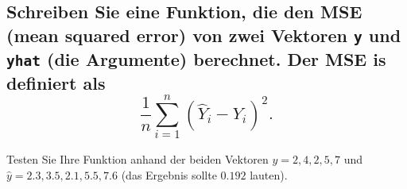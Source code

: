 \documentclass[12pt,a4paper]{article}
\begin{document}
\subsection{\texorpdfstring{Schreiben Sie eine Funktion, die den MSE
(mean squared error) von zwei Vektoren \texttt{y} und \texttt{yhat} (die
Argumente) berechnet. Der MSE is definiert als
\[\displaystyle \frac{1}{n}\sum_{i=1}^n (\hat{Y}_i - Y_i)^2.\]}{Schreiben Sie eine Funktion, die den MSE (mean squared error) von zwei Vektoren y und yhat (die Argumente) berechnet. Der MSE is definiert als \textbackslash displaystyle \textbackslash frac\{1\}\{n\}\textbackslash sum\_\{i=1\}\^{}n (\textbackslash hat\{Y\}\_i - Y\_i)\^{}2.}}\label{schreiben-sie-eine-funktion-die-den-mse-mean-squared-error-von-zwei-vektoren-y-und-yhat-die-argumente-berechnet.-der-mse-is-definiert-als-displaystyle-frac1nsum_i1n-haty_i---y_i2.}

Testen Sie Ihre Funktion anhand der beiden Vektoren
\(y = {2, 4, 2, 5, 7}\) und \(\hat{y}= {2.3, 3.5, 2.1, 5.5, 7.6}\) (das
Ergebnis sollte \(0.192\) lauten).
\end{document}
